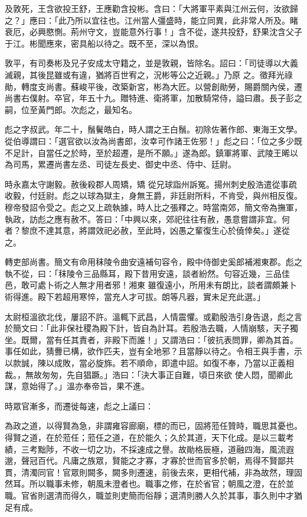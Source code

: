 \begin{pinyinscope}
 及敦死，王含欲投王舒，王應勸含投彬。含曰：「大將軍平素與江州云何，汝欲歸之？」應曰：「此乃所以宜往也。江州當人彊盛時，能立同異，此非常人所及。睹衰厄，必興愍惻。荊州守文，豈能意外行事！」含不從，遂共投舒，舒果沈含父子于江。彬聞應來，密具船以待之。既不至，深以為恨。



 敦平，有司奏彬及兄子安成太守籍之，並是敦親，皆除名。詔曰：「司徒導以大義滅親，其後昆雖或有違，猶將百世宥之，況彬等公之近親。」乃原
 之。徵拜光祿勛，轉度支尚書。蘇峻平後，改築新宮，彬為大匠。以營創勛勞，賜爵關內侯，遷尚書右僕射。卒官，年五十九。贈特進、衛將軍，加散騎常侍，謚曰肅。長子彭之嗣，位至黃門郎。次彪之，最知名。



 彪之字叔武。年二十，鬚鬢皓白，時人謂之王白鬚。初除佐著作郎、東海王文學。從伯導謂曰：「選官欲以汝為尚書郎，汝幸可作諸王佐邪！」彪之曰：「位之多少既不足計，自當任之於時，至於超遷，是所不願。」遂為郎。鎮軍將軍、武陵王晞以為司馬，累遷尚書左丞、司徒左長史、御史中丞、侍中、廷尉。



 時永嘉太守謝毅。赦後殺郡人周矯，矯
 從兄球詣州訴冤。揚州刺史殷浩遣從事疏收毅，付廷尉。彪之以球為獄主，身無王爵，非廷尉所料，不肯受，與州相反復。穆帝發詔令受之。彪之又上疏執據，時人比之張釋之。時當南郊，簡文帝為撫軍，執政，訪彪之應有赦不。答曰：「中興以來，郊祀往往有赦，愚意嘗謂非宜。何者？黎庶不達其意，將謂效祀必赦，至此時，凶愚之輩復生心於僥倖矣。」遂從之。



 轉吏部尚書。簡文有命用秣陵令曲安遠補句容令，殿中侍御史奚郎補湘東郡。彪之執不從，曰：「秣陵令三品縣耳，殿下昔用安遠，談者紛然。句容近幾，三品佳邑，敢可處卜術之人無才用者邪！湘東
 雖復遠小，所用未有朗比，談者謂頗兼卜術得進。殿下若超用寒悴，當充人才可拔。朗等凡器，實未足充此選。」



 太尉桓溫欲北伐，屢詔不許。溫輒下武昌，人情震懼。或勸殷浩引身告退，彪之言於簡文曰：「此非保社稷為殿下計，皆自為計耳。若殷浩去職，人情崩駭，天子獨坐。既爾，當有任其責者，非殿下而誰！」又謂浩曰：「彼抗表問罪，卿為其首。事任如此，猜釁已構，欲作匹夫，豈有全地邪？且當靜以待之。令相王與手書，示以款誠，陳以成敗，當必旋旆。若不順命，即遣中詔。如復不奉，乃當以正義相裁。，無故匆匆，先自猖蹶。」浩曰：「決大事正自難，頃日來欲
 使人悶，聞卿此謀，意始得了。」溫亦奉帝旨，果不進。



 時眾官漸多，而遷徙每速，彪之上議曰：



 為政之道，以得賢為急，非謂雍容廊廟，標的而已，固將蒞任贊時，職思其憂也。得賢之道，在於蒞任；蒞任之道，在於能久；久於其道，天下化成。是以三載考績，三考黜陟，不收一切之功，不採速成之譽。故勛格辰極，道融四海，風流遐邈，聲冠百代。凡庸之族眾，賢能之才寡，才寡於世而官多於朝，焉得不賢鄙共貫，清濁同官！官眾則闕多，闕多則遷速，前後去來，更相代補，非為故然，理固然耳。所以職事未修，朝風未澄者也。職事之修，在於省官；朝風之澄，在於並
 職。官省則選清而得久，職並則吏簡而俗靜；選清則勝人久於其事，事久則中才猶足有成。




\end{pinyinscope}
